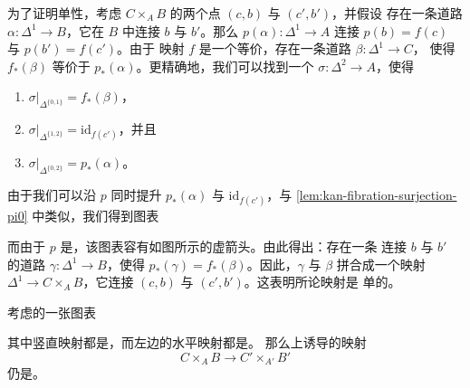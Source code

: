\begin{remark}
为了证明单性，考虑 $C \times_A B$ 的两个点 $(c, b)$ 与 $(c', b')$，并假设
存在一条道路 $\alpha\colon \Delta^1 \to B$，它在 $B$ 中连接 $b$ 与 $b'$。那么
$p(\alpha)\colon \Delta^1 \to A$ 连接 $p(b) = f(c)$ 与 $p(b') = f(c')$。由于
映射 $f$ 是一个\trHomotopy{}等价，存在一条道路 $\beta\colon \Delta^1 \to C$，
使得 $f_*(\beta)$ 等价于 $p_*(\alpha)$。更精确地，我们可以找到一个%
\trTwoCell{} $\sigma\colon \Delta^2 \to A$，使得
\begin{enumerate}[label=(\arabic*)]
  \item $\sigma|_{\Delta^{\{0,1\}}} = f_*(\beta)$，
  \item $\sigma|_{\Delta^{\{1,2\}}} = \mathrm{id}_{f(c')}$，并且
  \item $\sigma|_{\Delta^{\{0,2\}}} = p_*(\alpha)$。
\end{enumerate}
由于我们可以沿 $p$ 同时提升 $p_*(\alpha)$ 与 $\mathrm{id}_{f(c')}$，与%
\cref{lem:kan-fibration-surjection-pi0} 中类似，我们得到图表
\begin{center}
\end{center}
而由于 $p$ 是\trKanFibration{}，该图表容有如图所示的虚箭头。由此得出：存在一条
连接 $b$ 与 $b'$ 的道路 $\gamma\colon \Delta^1 \to B$，使得
$p_*(\gamma) = f_*(\beta)$。因此，$\gamma$ 与 $\beta$ 拼合成一个映射
$\Delta^1 \to C \times_A B$，它连接 $(c, b)$ 与 $(c', b')$。这表明所论映射是
单的。
\end{remark}

\begin{lemma}\label{lem:pullback-weak-equivalence}
考虑\trKanComplex{}的一张图表
\begin{center}
\end{center}
其中竖直映射都是\trWeakEquivalence{}，而左边的水平映射都是\trKanFibration{}。
那么\trPullback{}上诱导的映射
\[
C \times_A B \longrightarrow C' \times_{A'} B'
\]
仍是\trWeakEquivalence{}。
\end{lemma}

